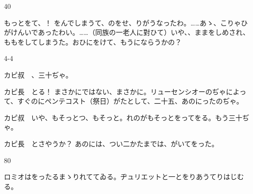 \documentclass[tate,paper=b6j,jafontsize=9pt]{jlreq}
\begin{document}
\begin{azconvIndented}{4\zw}{0\zw}

もっとをて、！ をんでしまうて、のをせ、りがうなったわ。……あゝ、こりゃひがけんいであったわい。……（同族の一老人に對ひて）いや、、ままをしめされ、ももをしてしまうた。おひにをけて、もうにならうかの？

\end{azconvIndented}
\begin{azconvIndented}{4\zw}{-4\zw}

カピ叔　、三十ぢゃ。

カピ長　とる！ まさかにではない、まさかに。リューセンシオーのぢゃによって、すぐのにペンテコスト（祭日）がたとして、二十五、あのにったのぢゃ。

カピ叔　いや、もそっとつ、もそっと。れのがもそっとをってをる。もう三十ぢゃ。

カピ長　とさやうか？ あのには、つい二かたまでは、がいてをった。

\end{azconvIndented}
\begin{azconvIndented}{8\zw}{0\zw}

ロミオはをったるまゝりれててゐる。ヂュリエットと一とをりあうてりはじむる。

\end{azconvIndented}
\end{document}
